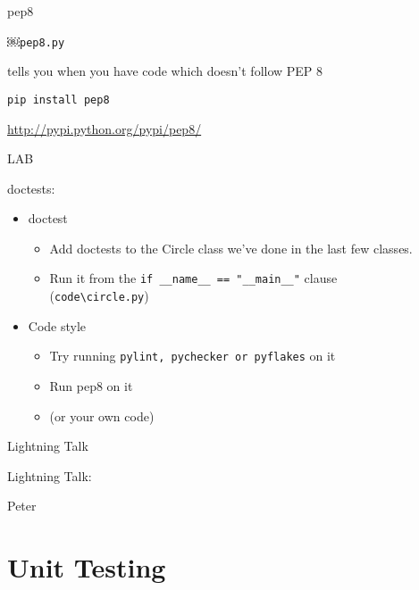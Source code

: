\documentclass{beamer}
\begin{document}
\begin{frame}[fragile]{pep8}

{\LARGE￼\verb|pep8.py|}

\vfill
{\Large tells you when you have code which doesn't follow PEP 8}

\vfill
\begin{verbatim}
pip install pep8
\end{verbatim}

\vfill
\url{http://pypi.python.org/pypi/pep8/}

\end{frame} 

\begin{frame}[fragile]{LAB}

{\Large doctests:}

\begin{itemize}
  \item doctest
    \begin{itemize}
       \item Add doctests to the Circle class we've done in the last few classes.
       \item Run it from the \verb|if __name__ == "__main__"| clause\\
             (\verb|code\circle.py|)
    \end{itemize}
  \item Code style
    \begin{itemize}
       \item Try running \verb|pylint, pychecker or pyflakes| on it 
       \item Run pep8 on it
       \item (or your own code)
    \end{itemize}

\end{itemize}

\end{frame}

\begin{frame}{Lightning Talk}

{\centering

\vfill
{\LARGE Lightning Talk:  }

\vfill
{\Huge Peter}

\vfill
}
\end{frame}

\section{Unit Testing}
\end{document}
